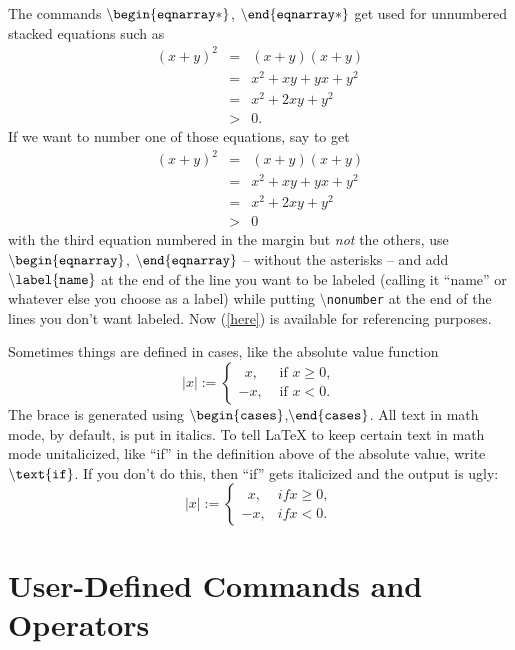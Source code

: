 \documentclass[12pt,letterpaper]{amsart}
\newcommand{\sm}{\setminus}
\newcommand{\pln}[1]{$\sm${\tt #1}}
\newcommand{\bgn}[1]{$\tt {\sm}begin\{#1\}$}
\newcommand{\nd}[1]{$\tt {\sm}end\{#1\}$}
\theoremstyle{plain}
\theoremstyle{definition}
\numberwithin{equation}{section}
\begin{document}
The commands 
\bgn{eqnarray*}, \nd{eqnarray*} 
get used for unnumbered stacked equations such as
\begin{eqnarray*}
(x+y)^2 & = & (x+y)(x+y) \\
& = & x^2 + xy + yx + y^2 \\
& = & x^2 + 2xy + y^2 \\
& > & 0.
\end{eqnarray*}
If we want to number one of those equations, say to get 
\begin{eqnarray}\label{e-eqnarray}
(x+y)^2 & = & (x+y)(x+y) \nonumber \\
& = & x^2 + xy + yx + y^2 \nonumber \\
& = & x^2 + 2xy + y^2 \label{here} \\
& > & 0 \nonumber
\end{eqnarray}
with the third equation numbered in the margin but {\it not} the others, 
use \bgn{eqnarray}, \nd{eqnarray} 
-- without the asterisks -- 
and add $\tt {\sm}label\{name\}$ at the end of the line you want to be labeled 
(calling it ``name'' or whatever else you choose as a label) 
while putting \pln{nonumber} at 
the end of the lines you don't want labeled.
Now (\ref{here}) is available for referencing purposes. 




Sometimes things are defined in cases, like the absolute value 
function 
$$
|x| := 
\begin{cases}
\ \ x, & \text{ if }  x \geq 0, \\
-x, & \text{ if } x < 0.
\end{cases}
$$
The brace is generated using 
\bgn{cases},\nd{cases}.
All text in math mode, by default, is put in italics.  
To tell LaTeX to keep certain text in math mode 
unitalicized, like ``if'' in the definition above of 
the absolute value, write $\tt {\sm}text\{ if \}$.  If you don't 
do this, then ``if'' gets italicized and the output is ugly:
$$
|x| := 
\begin{cases}
\ \ x, & if   x \geq 0, \\
-x, & if  x < 0.
\end{cases}
$$



\section{User-Defined Commands and Operators}
\end{document}
